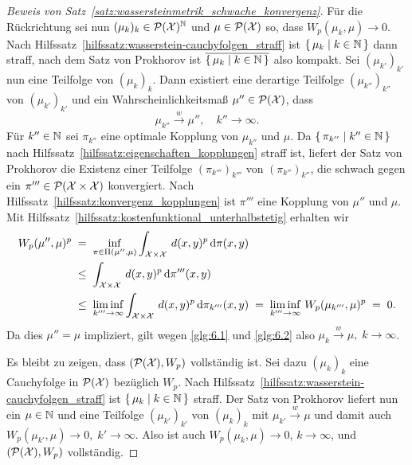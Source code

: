 \documentclass[../thesis/thesis.tex]{subfiles}
\begin{document}
\begin{proof}[Beweis von Satz~\ref{satz:wassersteinmetrik_schwache_konvergenz}]
		Für die Rückrichtung sei nun $(\mu_k)_k \in \mathcal{P}(\mathcal{X})^{\mathbb{N}}$ und $\mu \in \mathcal{P}(\mathcal{X})$ so, dass $W_p(\mu_k, \mu) \to 0$. Nach Hilfssatz~\ref{hilfssatz:wasserstein-cauchyfolgen_straff} ist $\left\{\, \mu_k \; \middle| \; k \in \mathbb{N} \,\right\}$ dann straff, nach dem Satz von Prokhorov ist $\overline{\left\{\, \mu_k \; \middle| \; k \in \mathbb{N} \,\right\}}$ also kompakt. Sei $(\mu_{k'})_{k'}$ nun eine Teilfolge von $(\mu_k)_k$. Dann existiert eine derartige Teilfolge $(\mu_{k''})_{k''}$ von $(\mu_{k'})_{k'}$ und ein Wahrscheinlichkeitsmaß $\mu'' \in \mathcal{P}(\mathcal{X})$, dass
		\[ \mu_{k''} \xrightarrow{w} \mu'', \quad k'' \to \infty \text{.} \label{glg:6.2} \tag{6.2} \]
		Für $k'' \in \mathbb{N}$ sei $\pi_{k''}$ eine optimale Kopplung von $\mu_{k''}$ und $\mu$. Da $\left\{\, \pi_{k''} \; \middle| \; k'' \in \mathbb{N} \,\right\}$ nach Hilfssatz~\ref{hilfssatz:eigenschaften_kopplungen} straff ist, liefert der Satz von Prokhorov die Existenz einer Teilfolge $(\pi_{k'''})_{k'''}$ von $(\pi_{k''})_{k''}$, die schwach gegen ein $\pi''' \in \mathcal{P}(\mathcal{X} \times \mathcal{X})$ konvergiert. Nach Hilfssatz~\ref{hilfssatz:konvergenz_kopplungen} ist $\pi'''$ eine Kopplung von $\mu''$ und $\mu$. Mit Hilfssatz~\ref{hilfssatz:kostenfunktional_unterhalbstetig} erhalten wir
		\begin{align*}
			W_p(\mu'', \mu)^p \; &= \; \inf_{\pi \in \Pi(\mu'', \mu)} \int_{\mathcal{X} \times \mathcal{X}} \, d(x, y)^p \, \mathrm{d}\pi(x, y) \\
			                \; &\leq \; \int_{\mathcal{X} \times \mathcal{X}} \, d(x, y)^p \, \mathrm{d}\pi'''(x, y) \\
			                \; &\leq \; \liminf_{k''' \to \infty} \int_{\mathcal{X} \times \mathcal{X}} \, d(x, y)^p \, \mathrm{d}\pi_{k'''}(x, y) \; = \; \liminf_{k''' \to \infty} \, W_p( \mu_{k'''}, \mu)^p \; = \; 0 \text{.}
		\end{align*}
		Da dies $\mu'' = \mu$ impliziert, gilt wegen \eqref{glg:6.1} und \eqref{glg:6.2} also
		$\mu_k \xrightarrow{w} \mu, \; k \to \infty$.
		
		Es bleibt zu zeigen, dass $(\mathcal{P}(\mathcal{X}), W_p)$ vollständig ist. Sei dazu $(\mu_k)_k$ eine Cauchyfolge in $\mathcal{P}(\mathcal{X})$ bezüglich $W_p$. Nach Hilfssatz~\ref{hilfssatz:wasserstein-cauchyfolgen_straff} ist 
		$\left\{\, \mu_k \; \middle| \; k \in \mathbb{N} \,\right\}$ straff. Der Satz von Prokhorov liefert nun ein $\mu \in \mathbb{N}$ und eine Teilfolge $(\mu_{k'})_{k'}$ von $(\mu_k)_k$ mit $\mu_{k'} \xrightarrow{w} \mu$ und damit auch
		$W_p(\mu_{k'}, \mu) \to 0, \; k' \to \infty$. Also ist auch $W_p(\mu_k, \mu) \to 0$, $k \to \infty$, und $(\mathcal{P}(\mathcal{X}), W_p)$ vollständig.
	\end{proof}
	
\end{document}
